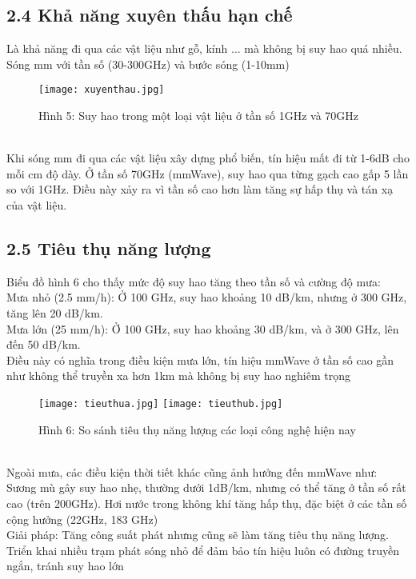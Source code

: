 \documentclass[a4paper,13pt]{article} %
\begin{document}
\subsection{2.4 Khả năng xuyên thấu hạn chế}
Là khả năng đi qua các vật liệu như gỗ, kính ... mà không bị suy hao quá nhiều. Sóng mm với tần số (30-300GHz) và bước sóng (1-10mm) 
\begin{figure}[htbp]
    \centering
    \texttt{[image: xuyenthau.jpg]}
    \caption*{Hình 5: Suy hao trong một loại vật liệu ở tần số 1GHz và 70GHz \cite{key2} }
    \label{fig:model}
\end{figure}\\
Khi sóng mm đi qua các vật liệu xây dựng phổ biến, tín hiệu mất đi từ 1-6dB cho mỗi cm độ dày. Ở tần số 70GHz (mmWave), suy hao qua từng gạch cao gấp 5 lần so với 1GHz. Điều này xảy ra vì tần số cao hơn làm tăng sự hấp thụ và tán xạ của vật liệu. 

\subsection{2.5 Tiêu thụ năng lượng}
Biểu đồ hình 6 cho thấy mức độ suy hao tăng theo tần số và cường độ mưa: \\
Mưa nhỏ (2.5 mm/h): Ở 100 GHz, suy hao khoảng 10 dB/km, nhưng ở 300 GHz, tăng lên 20 dB/km. \\
Mưa lớn (25 mm/h): Ở 100 GHz, suy hao khoảng 30 dB/km, và ở 300 GHz, lên đến 50 dB/km. \\
Điều này có nghĩa trong điều kiện mưa lớn, tín hiệu mmWave ở tần số cao gần như không thể truyền xa hơn 1km mà không bị suy hao nghiêm trọng
\begin{figure}[htbp]
    \centering
    \texttt{[image: tieuthua.jpg]}
    \texttt{[image: tieuthub.jpg]}
    \caption*{Hình 6: So sánh tiêu thụ năng lượng các loại công nghệ hiện nay \cite{key3} }
    \label{fig:model}
\end{figure}\\
Ngoài mưa, các điều kiện thời tiết khác cũng ảnh hưởng đến mmWave như: \\
Sương mù gây suy hao nhẹ, thường dưới 1dB/km, nhưng có thể tăng ở tần số rất cao (trên 200GHz). Hơi nước trong không khí tăng hấp thụ, đặc biệt ở các tần số cộng hưởng (22GHz, 183 GHz)\\
Giải pháp: Tăng công suất phát nhưng cũng sẽ làm tăng tiêu thụ năng lượng. Triển khai nhiều trạm phát sóng nhỏ để đảm bảo tín hiệu luôn có đường truyền ngắn, tránh suy hao lớn
\clearpage
\end{document}
